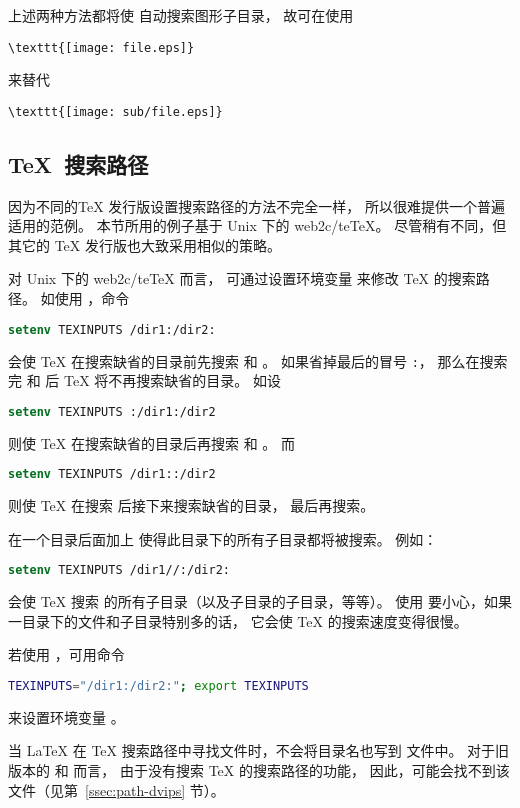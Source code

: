 上述两种方法都将使  自动搜索图形子目录，
故可在使用
\begin{lstlisting}
\texttt{[image: file.eps]}
\end{lstlisting}
来替代
\begin{lstlisting}
\texttt{[image: sub/file.eps]}
\end{lstlisting}

\subsection{\TeX{}~搜索路径}\label{ssec:texpath}

因为不同的\TeX{} 发行版设置搜索路径的方法不完全一样，
所以很难提供一个普遍适用的范例。
本节所用的例子基于 Unix 下的 web2c/te\TeX{}。
尽管稍有不同，但其它的 \TeX{} 发行版也大致采用相似的策略。

对 Unix 下的 web2c/te\TeX{} 而言，
可通过设置环境变量  来修改 \TeX{} 的搜索路径。
如使用 ，命令
\begin{lstlisting}[language=csh]
setenv TEXINPUTS /dir1:/dir2:
\end{lstlisting}
会使 \TeX{} 在搜索缺省的目录前先搜索  和 。
如果省掉最后的冒号 \texttt{:}，
那么在搜索完  和  后 \TeX{} 将不再搜索缺省的目录。
如设
\begin{lstlisting}[language=csh]
setenv TEXINPUTS :/dir1:/dir2
\end{lstlisting}
则使 \TeX{} 在搜索缺省的目录后再搜索  和 。
而
\begin{lstlisting}[language=csh]
setenv TEXINPUTS /dir1::/dir2
\end{lstlisting}
则使 \TeX{} 在搜索  后接下来搜索缺省的目录，
最后再搜索。

在一个目录后面加上 \file{//} 使得此目录下的所有子目录都将被搜索。
例如：
\begin{lstlisting}[language=csh]
setenv TEXINPUTS /dir1//:/dir2:
\end{lstlisting}
会使 \TeX{} 搜索  的所有子目录（以及子目录的子目录，等等）。
使用 \file{//} 要小心，如果一目录下的文件和子目录特别多的话，
它会使 \TeX{} 的搜索速度变得很慢。

若使用 ，可用命令
\begin{lstlisting}[language=sh]
TEXINPUTS="/dir1:/dir2:"; export TEXINPUTS
\end{lstlisting}
来设置环境变量 。

当 \LaTeX{} 在 \TeX{} 搜索路径中寻找文件时，不会将目录名也写到  文件中。
对于旧版本的  和  而言，
由于没有搜索 \TeX{} 的搜索路径的功能，
因此，可能会找不到该文件（见第~\ref{ssec:path-dvips} 节）。



